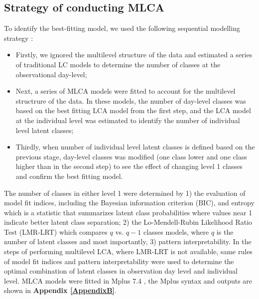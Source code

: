 \subsection{Strategy of conducting MLCA}\vspace{-0.3cm}

To identify the best-fitting model, we used the following sequential modelling strategy \parencite{henry2010multilevel}: 

\begin{itemize}
	\item Firstly, we ignored the multilevel structure of the data and estimated a series of traditional LC models to determine the number of classes at the observational day-level;
	\item Next, a series of MLCA models were fitted to account for the multilevel structrure of the data. In these models, the number of day-level classes was based on the best fitting LCA model from the first step, and the LCA model at the individual level was estimated to identify the number of individual level latent classes;
	\item Thirdly, when number of individual level latent classes is defined based on the previous stage, day-level classes was modified (one class lower and one class higher than in the second step) to see the effect of changing level 1 classes and confirm the best fitting model.
\end{itemize}

The number of classes in either level 1 were determined by 1) the evaluation of model fit indices, including the Bayesian information criterion (BIC), and entropy which is a statistic that summarizes latent class probabilities where values near 1 indicate better latent class separation; 2) the Lo-Mendell-Rubin Likelihood Ratio Test (LMR-LRT) \parencite{lo2001testing, nylund2007deciding} which compares $q$ vs. $q-1$ classes models, where $q$ is the number of latent classes and most importantly, 3) pattern interpretability. In the steps of performing multilevel LCA, where LMR-LRT is not available, same rules of model fit indices and pattern interpretability were used to determine the optimal combination of latent classes in observation day level and individual level. MLCA models were fitted in Mplus 7.4 \parencite{muthen2005mplus}, the Mplus syntax and outputs are shown in \textbf{Appendix \ref{AppendixB}}. \vspace{-0.3cm}



